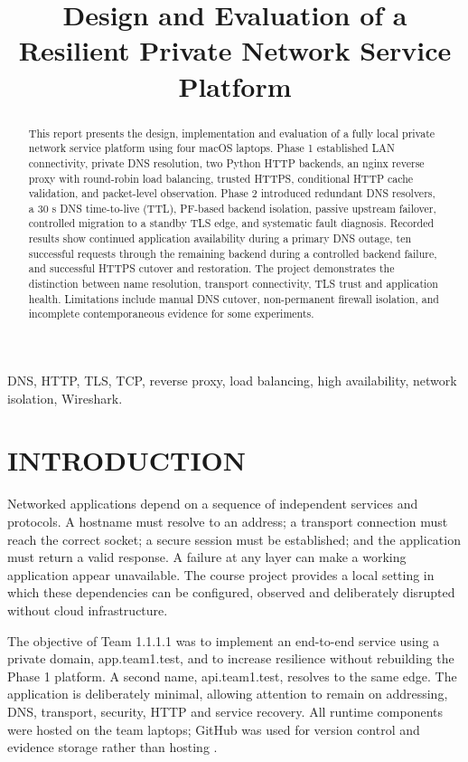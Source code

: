 \documentclass[conference]{IEEEtran}
\title{Design and Evaluation of a Resilient Private Network Service Platform}
\author{\IEEEauthorblockN{Saksham Narotra, Shrihari K.N, Rachit Singh, and Amogha Raj Sandur}
\IEEEauthorblockA{Team 1.1.1.1 --- Computer Networks Course Project --- November 2026}}
\begin{document}
\maketitle
\begin{abstract}
This report presents the design,
implementation and evaluation of a fully local private network service
platform using four macOS laptops. Phase 1 established LAN connectivity,
private DNS resolution, two Python HTTP backends, an nginx reverse proxy
with round-robin load balancing, trusted HTTPS, conditional HTTP cache
validation, and packet-level observation. Phase 2 introduced redundant
DNS resolvers, a 30 s DNS time-to-live (TTL), PF-based backend
isolation, passive upstream failover, controlled migration to a standby
TLS edge, and systematic fault diagnosis. Recorded results show
continued application availability during a primary DNS outage, ten
successful requests through the remaining backend during a controlled
backend failure, and successful HTTPS cutover and restoration. The
project demonstrates the distinction between name resolution, transport
connectivity, TLS trust and application health. Limitations include
manual DNS cutover, non-permanent firewall isolation, and incomplete
contemporaneous evidence for some experiments.
\end{abstract}
\begin{IEEEkeywords}
DNS, HTTP, TLS, TCP, reverse proxy, load
balancing, high availability, network isolation, Wireshark.
\end{IEEEkeywords}
\section{INTRODUCTION}\label{i.-introduction}

Networked applications depend on a sequence of independent services and
protocols. A hostname must resolve to an address; a transport connection
must reach the correct socket; a secure session must be established; and
the application must return a valid response. A failure at any layer can
make a working application appear unavailable. The course project
\cite{ref1}  provides a local setting in which these dependencies can be
configured, observed and deliberately disrupted without cloud
infrastructure.

The objective of Team 1.1.1.1 was to implement an end-to-end service
using a private domain, app.team1.test, and to increase resilience
without rebuilding the Phase 1 platform. A second name, api.team1.test,
resolves to the same edge. The application is deliberately minimal,
allowing attention to remain on addressing, DNS, transport, security,
HTTP and service recovery. All runtime components were hosted on the
team laptops; GitHub was used for version control and evidence storage
rather than hosting \cite{ref2}.
\end{document}
